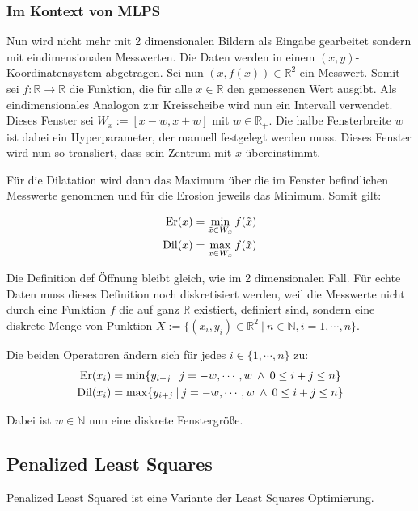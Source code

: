 \documentclass{article}
\newcommand{\R}[0]{\mathbb{R}}
\begin{document}
\subsubsection{Im Kontext von MLPS}

Nun wird nicht mehr mit 2 dimensionalen Bildern als Eingabe gearbeitet sondern mit eindimensionalen Messwerten. Die Daten werden in einem $(x,y)$-Koordinatensystem abgetragen. 
Sei nun $(x,f(x)) \in \R^2$ ein Messwert. Somit sei $f:\R \to \R$ die Funktion, die für alle $x \in \R$ den gemessenen Wert ausgibt. Als eindimensionales Analogon zur Kreisscheibe wird nun ein Intervall verwendet. 
Dieses Fenster sei $W_x := [x-w, x+w]$ mit $w \in \R_+$. Die halbe Fensterbreite $w$ ist dabei ein Hyperparameter, der manuell festgelegt werden muss. 
Dieses Fenster wird nun so transliert, dass sein Zentrum mit $x$ übereinstimmt.

Für die Dilatation wird dann das Maximum über die im Fenster befindlichen Messwerte genommen und für die Erosion jeweils das Minimum. Somit gilt:

\begin{align}
    {\rm Er}(x)  &= \min\limits_{\tilde{x} \in W_x} f(\tilde{x}) \\
    {\rm Dil}(x) &= \max\limits_{\tilde{x} \in W_x} f(\tilde{x})
\end{align}

Die Definition def Öffnung bleibt gleich, wie im 2 dimensionalen Fall.
Für echte Daten muss dieses Definition noch diskretisiert werden, weil die Messwerte nicht durch eine Funktion $f$ die auf ganz $\R$ existiert, definiert sind, sondern eine diskrete Menge von Punktion $X := \{(x_i,y_i) \in \R^2 \: | \: n\in \mathbb{N}, i=1,\cdots,n \}$.

Die beiden Operatoren ändern sich für jedes $i\in \{1,\cdots,n\}$ zu:
\begin{align}
    {\rm Er}(x_i) &= \min \{y_{i+j} \: | \: j=-w,\cdots,w \: \land \: 0 \leq i + j \leq n\} \\
    {\rm Dil}(x_i)  &= \max \{y_{i+j} \: | \: j=-w,\cdots,w \: \land \: 0 \leq i + j \leq n\}
\end{align}

Dabei ist $w \in \mathbb{N}$ nun eine diskrete Fenstergröße.

\subsection{Penalized Least Squares}
Penalized Least Squared ist eine Variante der Least Squares Optimierung.
\end{document}
